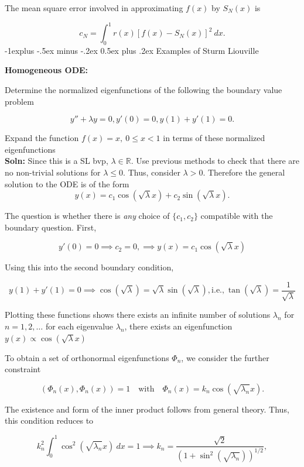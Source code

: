 \documentclass[10pt,landscape]{article}
\makeatletter
\renewcommand{\subsection}{\@startsection{subsection}{2}{0mm}%
                                {-1explus -.5ex minus -.2ex}%
                                {0.5ex plus .2ex}%
                                {\normalfont\normalsize\bfseries}}
\makeatother
\begin{document}
\begin{multicols}{2}
The mean square error involved in approximating $f(x)$ by $S_N(x)$ is 

$$c_N = \int_0^1 r(x)\left[f(x)-S_N(x)\right]^2\ dx.$$
\subsection{Examples of Sturm Liouville}

\textbf{Homogeneous ODE:}

Determine the normalized eigenfunctions of the following the boundary value problem

$$y''+\lambda y = 0, y'(0)=0, y(1) + y'(1) = 0.$$

Expand the function $f(x) = x, \ 0\le x<1$ in terms of these normalized eigenfunctions\\
\medskip
\textbf{Soln:} Since this is a SL bvp, $\lambda\in\mathbb{R}$. Use previous methods to check that there are no non-trivial solutions for $\lambda\le 0$. Thus, consider $\lambda > 0$. Therefore the general solution to the ODE is of the form \\

$$y(x) = c_1\cos(\sqrt{\lambda}x) + c_2\sin(\sqrt{\lambda}x).$$

The question is whether there is \textit{any} choice of $\{c_1,c_2\}$ compatible with the boundary question. First, 

$$y'(0) = 0\implies c_2 = 0, \implies y(x) = c_1\cos(\sqrt{\lambda}x)$$

Using this into the second boundary condition,

$$y(1)+y'(1) = 0 \implies \cos(\sqrt{\lambda}) = \sqrt{\lambda}\sin(\sqrt{\lambda}),  \text{i.e.,}  \ \tan(\sqrt{\lambda}) = \frac{1}{\sqrt{\lambda}}$$

Plotting these functions shows there exists an infinite number of solutions $\lambda_n$ for $n=1,2,\dots$ for each eigenvalue $\lambda_n$, there exists an eigenfunction $y(x)\propto \cos(\sqrt{\lambda}x)$

To obtain a set of orthonormal eigenfunctions $\Phi_n$, we consider the further constraint

$$(\Phi_n(x), \Phi_n(x)) = 1 \quad \text{with} \quad \Phi_n(x) = k_n\cos(\sqrt{\lambda_n}x).$$

The existence and form of the inner product follows from general theory. Thus, this condition reduces to 

$$k_n^2\int_0^1\cos^2(\sqrt{\lambda_n}x) \ dx = 1 \implies k_n = \frac{\sqrt{2}}{(1+\sin^2(\sqrt{\lambda_n}))^{1/2}},$$


\end{multicols}
\end{document}
